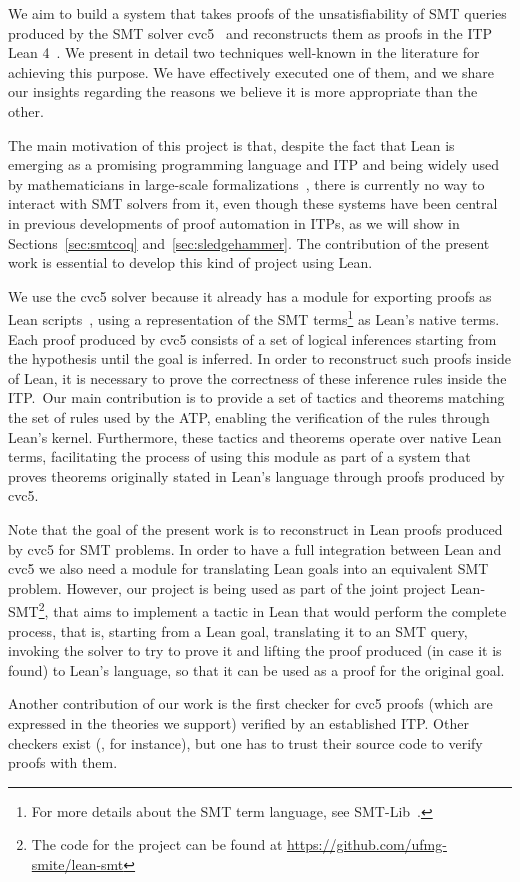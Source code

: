 We aim to build a system that takes proofs of the unsatisfiability of
SMT queries produced by the SMT solver cvc5~\cite{cvc5} and
reconstructs them as proofs in the ITP Lean 4~\cite{lean}.
We present in detail two techniques well-known in the literature for achieving this purpose.
We have effectively executed one of them, and we share our insights
regarding the reasons we believe it is more appropriate than the other.

The main motivation of this project is that, despite the fact that Lean is
emerging as a promising programming language and ITP and being
widely used by mathematicians in large-scale
formalizations~\cite{scholze, mathlib}, there is currently no way to
interact with SMT solvers from it, even though these systems have been
central in previous developments of proof automation in ITPs, as we will show in Sections~\ref{sec:smtcoq}
and~\ref{sec:sledgehammer}. The contribution of the present work
is essential to develop this kind of project using Lean.

We use the cvc5 solver because it already has a module for exporting proofs as
Lean scripts~\cite{Barbosa2022}, using a representation of the SMT terms\footnote{For more details
about the SMT term language, see SMT-Lib~\cite{smtlib}.} as Lean's native terms.
Each proof produced by cvc5 consists of a set of logical inferences starting from the
hypothesis until the goal is inferred. In order to reconstruct such proofs inside of
Lean, it is necessary to prove the correctness of these inference rules inside the
ITP.\ Our main contribution is to provide a set of tactics and theorems matching the set
of rules used by the ATP, enabling the verification of the rules through Lean's kernel.
Furthermore, these tactics and theorems operate over native Lean terms, facilitating the
process of using this module as part of a system that proves theorems originally stated
in Lean's language through proofs produced by cvc5.

Note that the goal of the present work is to reconstruct in Lean proofs produced by
cvc5 for SMT problems. In order to have a full integration between Lean and cvc5 we also
need a module for translating Lean goals into an equivalent SMT problem.
However, our project is being used as part of the joint project Lean-SMT\footnote{The
  code for the project can be found at \url{https://github.com/ufmg-smite/lean-smt}},
that aims to implement a tactic in Lean that would perform the complete process, that is,
starting from a Lean goal, translating it to an SMT query, invoking the solver to try
to prove it and lifting the proof produced (in case it is found) to Lean's language,
so that it can be used as a proof for the original goal.

Another contribution of our work is the first checker for cvc5 proofs
(which are expressed in the theories we support)
verified by an established ITP.
Other checkers exist (\cite{carcara}, for instance), but one has to
trust their source code to verify proofs with them.
